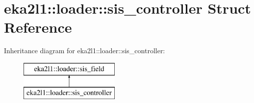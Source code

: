 \hypertarget{structeka2l1_1_1loader_1_1sis__controller}{}\section{eka2l1\+:\+:loader\+:\+:sis\+\_\+controller Struct Reference}
\label{structeka2l1_1_1loader_1_1sis__controller}
Inheritance diagram for eka2l1\+:\+:loader\+:\+:sis\+\_\+controller\+:\begin{figure}[H]
\begin{center}
\leavevmode
\includegraphics[height=2.000000cm]{structeka2l1_1_1loader_1_1sis__controller}
\end{center}
\end{figure}
